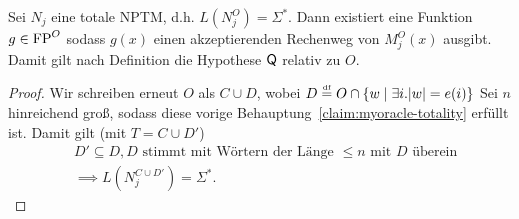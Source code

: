 \begin{claim}\label{claim:myoracle-q}
    Sei $N_j$ eine totale NPTM, d.h. $L(N_j^O)=\Sigma^*$. Dann existiert eine Funktion $g\in \mathrm{FP}^O$ sodass $g(x)$ einen akzeptierenden Rechenweg von $M^O_j(x)$ ausgibt. Damit gilt nach Definition die Hypothese $\mathsf{Q}$ relativ zu $O$.
\end{claim}
\begin{proof}
    Wir schreiben erneut $O$ als $C\cup D$, wobei $D\stackrel{\text{\smash{\tiny df}}}{=} O \cap \{ w \mid \exists i.|w|=e(i)\}$
    Sei $n$ hinreichend groß, sodass diese vorige Behauptung~\ref{claim:myoracle-totality} erfüllt ist.
    Damit gilt (mit $T=C\cup D'$) 
    \begin{equation} \begin{split}&D'\subseteq D, \text{$D$ stimmt mit Wörtern der Länge $\leq n$ mit $D$ überein} \\ &\implies L(N_j^{C\cup D'})=\Sigma^*.\end{split}\label{eq:myoracle-1a} \end{equation}



\end{proof}
